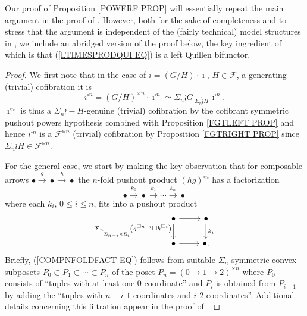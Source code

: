 \documentclass[a4paper,10pt]{article}%
\begin{document}
Our proof of Proposition \ref{POWERF PROP} will essentially repeat the main argument in the proof of
\cite[Thm. 1.2]{Pe16}.
However, both for the sake of completeness and to stress that the argument is independent of the (fairly technical) model structures in \cite{Pe16}, we include an abridged version of the proof below, the key ingredient 
of which is that (\ref{LTIMESPRODQUI EQ}) is a left Quillen bifunctor. 


\begin{proof}
	We first note that in the case of 
	$i = (G/H) \cdot \bar{\imath}$, $H\in \mathcal{F}$, a generating (trivial) cofibration it is 
	\[i^{\square n} = 
	(G/H)^{\times n} \cdot \bar{\imath}^{\square n}
	\simeq \Sigma_n \wr G 
	\underset{\Sigma_n \wr H}{\cdot} \bar{\imath}^{\square n}.\]
$\bar{\imath}^{\square n}$ is thus a $\Sigma_n \wr-H$-genuine (trivial) cofibration by the cofibrant symmetric pushout powers hypothesis combined with Proposition \ref{FGTLEFT PROP} and hence 
$i^{\square n}$ is a $\mathcal{F}^{\ltimes n}$ 
(trivial) cofibration by Proposition \ref{FGTRIGHT PROP}
since $\Sigma_n \wr H \in \mathcal{F}^{\ltimes n}$.


	For the general case, we start by making the key observation that for composable arrows 
	$\bullet \xrightarrow{g} \bullet \xrightarrow{h} \bullet$ the $n$-fold pushout product $(hg)^{\square n}$ has a factorization
\begin{equation}\label{COMPNFOLDFACT EQ}
	\bullet
		\xrightarrow{k_0}
	\bullet
		\xrightarrow{k_1}
	\cdots
		\xrightarrow{k_n}
	\bullet
\end{equation}
where each $k_i$, $0 \leq i \leq n$, fits into a pushout product
\begin{equation}\label{COMPNFOLDFACTPUSH EQ}
\begin{tikzcd}
	\bullet \ar{r} \ar{d}[swap] 
	{\Sigma_n \underset{\Sigma_{n-i} \times \Sigma_i}
	{\cdot}\left( g^{\square n-i} \square h^{\square i} \right)} 
	\ar[dr,phantom, "\ulcorner", near start]
	&
	\bullet \ar{d}{k_i}
\\
	\bullet \ar{r} 
	&
	\bullet.
\end{tikzcd}
\end{equation}
Briefly, (\ref{COMPNFOLDFACT EQ}) follows from suitable $\Sigma_n$-symmetric convex subposets 
$P_0 \subset P_1 \subset \cdots \subset P_n$
of the poset $P_n = (0 \to 1 \to 2)^{\times n}$ 
where $P_0$ consists of ``tuples with at least one $0$-coordinate'' and $P_i$ is obtained from $P_{i-1}$ by adding the ``tuples with $n-i$ $1$-coordinates and $i$ $2$-coordinates''.
Additional details concerning this filtration appear in the proof of \cite[Lemma 4.8]{Pe16}.



\end{proof}
\end{document}
